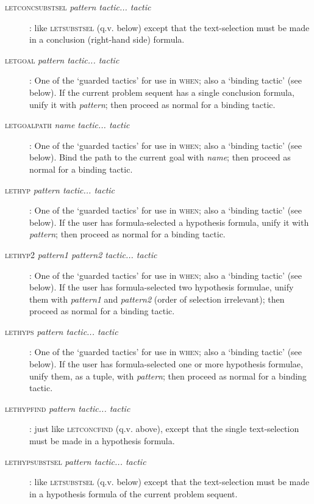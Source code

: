 \begin{description}
\item [\textsc{letconcsubstsel} \textit{pattern tactic... tactic}]: like \textsc{letsubstsel} (q.v. below) except that the text-selection must be made in a conclusion (right-hand side) formula.

\item [\textsc{letgoal} \textit{pattern tactic... tactic}]: One of the `guarded tactics' for use in \textsc{when}; also a `binding tactic' (see below). If the current problem sequent has a single conclusion formula, unify it with \textit{pattern}; then proceed as normal for a binding tactic.

\item [\textsc{letgoalpath}  \textit{name tactic... tactic}]: One of the `guarded tactics' for use in \textsc{when}; also a `binding tactic' (see below). Bind the path to the current goal with \textit{name}; then proceed as normal for a binding tactic.
\item [\textsc{lethyp} \textit{pattern tactic... tactic}]: One of the `guarded tactics' for use in \textsc{when}; also a `binding tactic' (see below). If the user has formula-selected a hypothesis formula, unify it with \textit{pattern}; then proceed as normal for a binding tactic.
\item [\textsc{lethyp2} \textit{pattern1 pattern2 tactic... tactic}]: One of the `guarded tactics' for use in \textsc{when}; also a `binding tactic' (see below). If the user has formula-selected two hypothesis formulae, unify them with \textit{pattern1} and \textit{pattern2} (order of selection irrelevant); then proceed as normal for a binding tactic.
\item [\textsc{lethyps} \textit{pattern tactic... tactic}]: One of the `guarded tactics' for use in \textsc{when}; also a `binding tactic' (see below). If the user has formula-selected one or more hypothesis formulae, unify them, as a tuple, with \textit{pattern}; then proceed as normal for a binding tactic.


\item [\textsc{lethypfind} \textit{pattern tactic... tactic}]: just like \textsc{letconcfind} (q.v. above), except that the single text-selection must be made in a hypothesis formula.

\item [\textsc{lethypsubstsel} \textit{pattern tactic... tactic}]: like \textsc{letsubstsel} (q.v. below) except that the text-selection must be made in a hypothesis formula of the current problem sequent.


\end{description}
